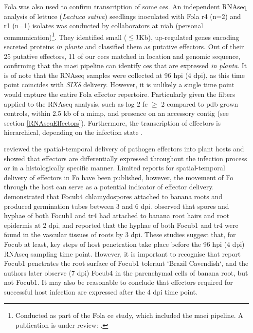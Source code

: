 \ac{Fola} was also used to confirm transcription of some \acp{ce}. An independent RNAseq analysis of lettuce (\textit{Lactuca sativa}) seedlings inoculated with \ac{Fola} \ac{r4} (n=2) and \ac{r1} (n=1) isolates was conducted by collaborators at \ac{niab} (personal communication)\footnote{Conducted as part of the \acl{Fola} \ac{ce} study, which included the \ac{maei} pipeline. A publication is under review: \textcite{FolaManuscript}.}. They identified small ($\le1$Kb), up-regulated genes encoding secreted proteins \textit{in planta} and classified them as putative effectors. Out of their 25 putative effectors, 11 of our \acp{cec} matched in location and genomic sequence, confirming that the \ac{maei} pipeline can identify \acp{ce} that are expressed \textit{in planta}. It is of note that the RNAseq samples were collected at 96 \ac{hpi} (4 \ac{dpi}), as this time point coincides with \textit{SIX8} delivery. However, it is unlikely a single time point would capture the entire \ac{Fola} effector repertoire. Particularly given the filters applied to the RNAseq analysis, such as log 2 \ac{fc} $\geq$ 2 compared to \ac{pdb} grown controls, within 2.5 kb of a \ac{mimp}, and presence on an accessory contig (see section \ref{RNAseqEffectors}). Furthermore, the transcription of effectors is hierarchical, depending on the infection state \parencite{Giraldo2013}. 

\textcite{Toruno2016} reviewed the spatial-temporal delivery of pathogen effectors into plant hosts and showed that effectors are differentially expressed throughout the infection process or in a histologically specific manner. Limited reports for spatial-temporal delivery of effectors in \ac{Fo} have been published, however, the movement of \ac{Fo} through the host can serve as a potential indicator of effector delivery. \textcite{Li2011} demonstrated that \ac{Focub4} chlamydospores attached to banana roots and produced germination tubes between 3 and 6 \ac{dpi}. \textcite{Li2017} observed that spores and hyphae of both \ac{Focub1} and \ac{tr4} had attached to banana root hairs and root epidermis at 2 \ac{dpi}, and reported that the hyphae of both \ac{Focub1} and \ac{tr4} were found in the vascular tissues of roots by 3 \ac{dpi}. These studies suggest that, for \ac{Focub} at least, key steps of host penetration take place before the 96 \ac{hpi} (4 \ac{dpi}) RNAseq sampling time point. However, it is important to recognise that \textcite{Li2017} report \ac{Focub1} penetrates the root surface of \ac{Focub1} tolerant `Brazil Cavendish`, and the authors later observe (7 \ac{dpi})  \ac{Focub4} in the parenchymal cells of banana root, but not \ac{Focub1}. It may also be reasonable to conclude that effectors required for successful host infection are expressed after the 4 \ac{dpi} time point.  



